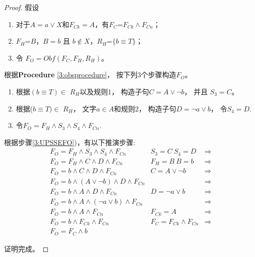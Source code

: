 \begin{proof}
假设
\begin{enumerate}
 \item 对于$A=a\vee X$和$F_{Ck}=A$，有$F_C$=$F_{Ck} \wedge F_{Cn}$；
 \item $F_H$=$B$，$B=b$ 且 $b\notin X$，$R_H$=$\{b\equiv T\}$；
 \item 令 $F_O=Obf(F_C,F_H,R_H)$。
 \end{enumerate}
根据\textbf{Procedure} \ref{3:obsprocedure}， 按下列3个步骤构造$F_O$。
\begin{enumerate}
\item 根据$(b\equiv T) \in $ $R_H$以及规则1，
构造子句$C=A\vee \neg b$， 并且 $S_3=C$。
\item 根据($b\equiv T) \in $ $R_H$， 文字$a\in A$和规则2，
构造子句$D=\neg a\vee b$，
令$S_4=D$.
\item \label{3:UPSSEFO}
令$F_O=F_H \wedge S_3\wedge S_4 \wedge F_{Cn}$.
\end{enumerate}
根据步骤\ref{3:UPSSEFO})，有以下推演步骤:
\begin{equation}
\begin{array}{ccc}
F_O  =  F_H \wedge S_3\wedge S_4\wedge F_{Cn}           &S_3=C~ S_4=D              &\Longrightarrow\\
F_O  =  F_H\wedge C\wedge D\wedge F_{Cn}                &F_H=B~ B=b                &\Longrightarrow\\
F_O  =  b\wedge C\wedge D\wedge F_{Cn}                  &C=A\vee \neg b~           &\Longrightarrow\\
F_O  =  b\wedge (A\vee \neg b) \wedge D\wedge F_{Cn}    &                          &\Longrightarrow\\
F_O  =  b\wedge A \wedge D\wedge F_{Cn}                 & D=\neg a\vee b~          &\Longrightarrow\\
F_O  =  b\wedge A \wedge (\neg a\vee b)\wedge F_{Cn}    &                          &\Longrightarrow\\
F_O  =  b\wedge A \wedge F_{Cn}                         &F_{Ck} =A                 &\Longrightarrow\\
F_O  =  b\wedge F_{Ck}\wedge F_{Cn}                     & F_C=F_{Ck} \wedge F_{Cn} &\Longrightarrow\\
F_O  =  F_C \wedge b                                    &   &
\end{array}
\end{equation}

证明完成。
\end{proof}

